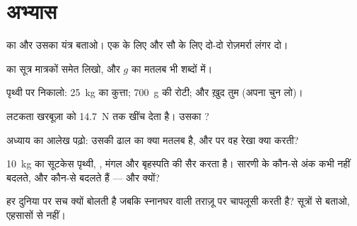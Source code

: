\section{अभ्यास}

\begin{exercise}[$\star$]\label{exo:g9:weight-vs-mass:1}
 का  और उसका यंत्र बताओ। एक  के लिए और सौ  के लिए
दो-दो रोज़मर्रा लंगर दो।
\end{exercise}

\begin{exercise}[$\star$]\label{exo:g9:weight-vs-mass:2}
 का सूत्र मात्रकों समेत लिखो, और $g$ का मतलब भी शब्दों में।
\end{exercise}

\begin{exercise}[$\star$]\label{exo:g9:weight-vs-mass:3}
पृथ्वी पर  निकालो: \qty{25}{kg} का कुत्ता; \qty{700}{g} की रोटी;
और ख़ुद तुम (अपना  चुन लो)।
\end{exercise}

\begin{exercise}[$\star$]\label{exo:g9:weight-vs-mass:4}
लटकता खरबूज़ा  को \qty{14.7}{N} तक खींच देता है। उसका ?
\end{exercise}

\begin{exercise}[$\star$]\label{exo:g9:weight-vs-mass:5}
अध्याय का आलेख पढ़ो: उसकी ढाल का क्या मतलब है, और  पर वह रेखा
क्या करती?
\end{exercise}

\begin{exercise}[$\star$]\label{exo:g9:weight-vs-mass:6}
\qty{10}{kg} का सूटकेस पृथ्वी, , मंगल और बृहस्पति की सैर करता
है। सारणी के कौन-से अंक कभी नहीं बदलते, और कौन-से बदलते हैं --- और
क्यों?
\end{exercise}

\begin{exercise}[$\star$]\label{exo:g9:weight-vs-mass:7}
 हर दुनिया पर सच क्यों बोलती है जबकि स्नानघर वाली तराज़ू  पर
चापलूसी करती है? सूत्रों से बताओ, एहसासों से नहीं।
\end{exercise}

